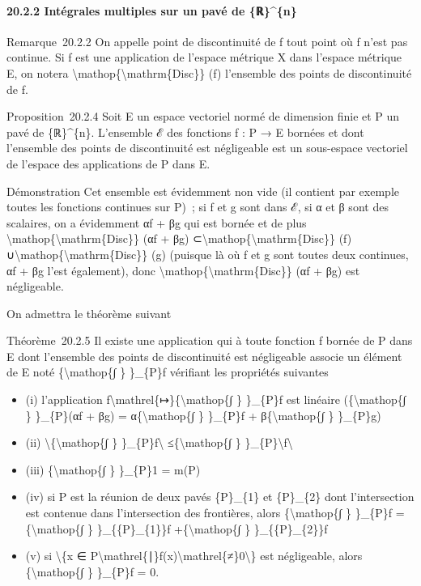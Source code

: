 \documentclass[]{article}
\begin{document}
\paragraph{20.2.2 Intégrales multiples sur un pavé de \{ℝ\}\^{}\{n\}}

Remarque~20.2.2 On appelle point de discontinuité de f tout point où f
n'est pas continue. Si f est une application de l'espace métrique X dans
l'espace métrique E, on notera
\textbackslash{}mathop\{\textbackslash{}mathrm\{Disc\}\} (f) l'ensemble
des points de discontinuité de f.

Proposition~20.2.4 Soit E un espace vectoriel normé de dimension finie
et P un pavé de \{ℝ\}\^{}\{n\}. L'ensemble ℰ des fonctions f : P → E
bornées et dont l'ensemble des points de discontinuité est négligeable
est un sous-espace vectoriel de l'espace des applications de P dans E.

Démonstration Cet ensemble est évidemment non vide (il contient par
exemple toutes les fonctions continues sur P)~; si f et g sont dans ℰ,
si α et β sont des scalaires, on a évidemment αf + βg qui est bornée et
de plus \textbackslash{}mathop\{\textbackslash{}mathrm\{Disc\}\} (αf +
βg) ⊂\textbackslash{}mathop\{\textbackslash{}mathrm\{Disc\}\} (f)
∪\textbackslash{}mathop\{\textbackslash{}mathrm\{Disc\}\} (g) (puisque
là où f et g sont toutes deux continues, αf + βg l'est également), donc
\textbackslash{}mathop\{\textbackslash{}mathrm\{Disc\}\} (αf + βg) est
négligeable.

On admettra le théorème suivant

Théorème~20.2.5 Il existe une application qui à toute fonction f bornée
de P dans E dont l'ensemble des points de discontinuité est négligeable
associe un élément de E noté \{\textbackslash{}mathop\{∫ \} \}\_\{P\}f
vérifiant les propriétés suivantes

\begin{itemize}
\itemsep1pt\parskip0pt
\item
  (i) l'application
  f\textbackslash{}mathrel\{↦\}\{\textbackslash{}mathop\{∫ \} \}\_\{P\}f
  est linéaire (\{\textbackslash{}mathop\{∫ \} \}\_\{P\}(αf + βg) =
  α\{\textbackslash{}mathop\{∫ \} \}\_\{P\}f +
  β\{\textbackslash{}mathop\{∫ \} \}\_\{P\}g)
\item
  (ii) \textbackslash{}\textbar{}\{\textbackslash{}mathop\{∫ \}
  \}\_\{P\}f\textbackslash{}\textbar{} ≤\{\textbackslash{}mathop\{∫ \}
  \}\_\{P\}\textbackslash{}\textbar{}f\textbackslash{}\textbar{}
\item
  (iii) \{\textbackslash{}mathop\{∫ \} \}\_\{P\}1 = m(P)
\item
  (iv) si P est la réunion de deux pavés \{P\}\_\{1\} et \{P\}\_\{2\}
  dont l'intersection est contenue dans l'intersection des frontières,
  alors \{\textbackslash{}mathop\{∫ \} \}\_\{P\}f
  =\{\textbackslash{}mathop\{∫ \} \}\_\{\{P\}\_\{1\}\}f
  +\{\textbackslash{}mathop\{∫ \} \}\_\{\{P\}\_\{2\}\}f
\item
  (v) si \textbackslash{}\{x ∈
  P\textbackslash{}mathrel\{∣\}f(x)\textbackslash{}mathrel\{≠\}0\textbackslash{}\}
  est négligeable, alors \{\textbackslash{}mathop\{∫ \} \}\_\{P\}f = 0.
\end{itemize}
\end{document}
